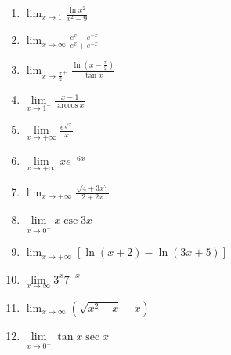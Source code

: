\documentclass[12pt]{article}
\newif\ifans
\begin{document}
\begin{enumerate}
\ifans{\fbox{$\frac{2}{3}$}} \fi

\item $\lim_{x \rightarrow 1}{\frac{\ln{x^2}}{x^2-9}}$

\ifans{\fbox{$0$}} \fi

\item $\lim_{x \rightarrow \infty}{\frac{e^x-e^{-x}}{e^x+e^{-x}}}$

\ifans{\fbox{$1$}} \fi

\item $\lim_{x \rightarrow \frac{\pi}{2}^{+}}{\frac{\ln{\left(x-\frac{\pi}{2}\right)}}{\tan{x}}}$

\ifans{\fbox{$0$}} \fi

\item $\lim\limits_{x\rightarrow 1^-} \frac{x-1}{\arccos{x}}$ 

\ifans{\fbox{0}} \fi

\item $\lim\limits_{x\rightarrow +\infty}\frac{e^{\sqrt{x}}}{x}$ 

\ifans{\fbox{$+\infty$}} \fi

\item $\lim\limits_{x\rightarrow +\infty} xe^{-6x}$ 

\ifans{\fbox{0}} \fi

\item $\lim_{x \rightarrow +\infty}{\frac{\sqrt{4+3x^2}}{2+2x}}$

\ifans{\fbox{$\frac{\sqrt{3}}{2}$}} \fi

\item $\lim\limits_{x\rightarrow 0^+} x \csc{3x}$

\ifans{\fbox{$\frac{1}{3}$}} \fi  

\item $\lim_{x \rightarrow+\infty}\left[\ln{(x+2)}-\ln{(3x+5)}\right]$

\ifans{\fbox{$\ln{\left(\frac{1}{3}\right)}$}} \fi

\item $\lim\limits_{x\rightarrow \infty} 3^{x}7^{-x}$ 

\ifans{\fbox{0}} \fi

\item  $\displaystyle \lim_{x\rightarrow \infty}{\left(\sqrt{x^2-x}-x\right)}$

\ifans{\fbox{$\displaystyle -\frac{1}{2}$}} \fi

\item $\lim\limits_{x\rightarrow 0^+} \tan{x}\sec{x}$ 


\end{enumerate}
\end{document}

